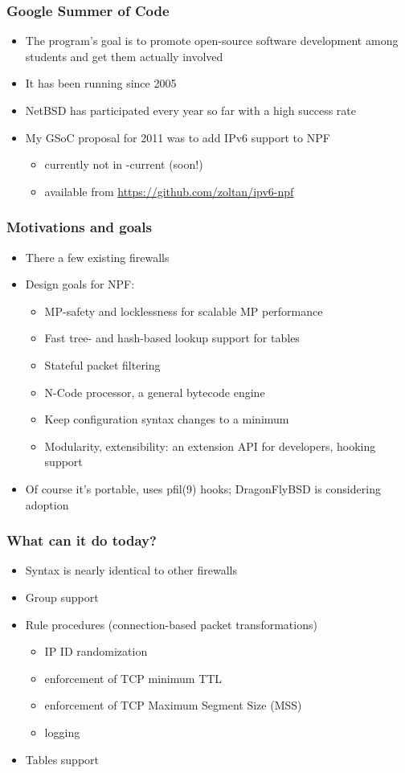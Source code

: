 \documentclass[magyar]{beamer}
\begin{document}
\begin{frame}
\frametitle{Google Summer of Code}
\begin{itemize}
	\item The program's goal is to promote open-source software development among students and get them actually involved
	\item It has been running since 2005
	\item NetBSD has participated every year so far with a high success rate
	\item My GSoC proposal for 2011 was to add IPv6 support to NPF
		\begin{itemize}
			\item currently not in -current (soon!)
			\item available from \url{https://github.com/zoltan/ipv6-npf}
		\end{itemize}
\end{itemize}
\end{frame}

\begin{frame}
\frametitle{Motivations and goals}
\begin{itemize}
	\item There a few existing firewalls
	\item Design goals for NPF:
	\begin{itemize}
		\item MP-safety and locklessness for scalable MP performance
		\item Fast tree- and hash-based lookup support for tables
		\item Stateful packet filtering
		\item N-Code processor, a general bytecode engine
		\item Keep configuration syntax changes to a minimum
		\item Modularity, extensibility: an extension API for developers, hooking support
	\end{itemize}
	\item Of course it's portable, uses pfil(9) hooks; DragonFlyBSD is considering adoption 
\end{itemize}
\end{frame}

\begin{frame}
\frametitle{What can it do today?}
\begin{itemize}
	\item Syntax is nearly identical to other firewalls
	\item Group support
	\item Rule procedures (connection-based packet transformations)
	\begin{itemize}
		\item IP ID randomization
		\item enforcement of TCP minimum TTL
		\item enforcement of TCP Maximum Segment Size (MSS)
		\item logging
	\end{itemize}
	\item Tables support
\end{itemize}
\end{frame}
\end{document}
